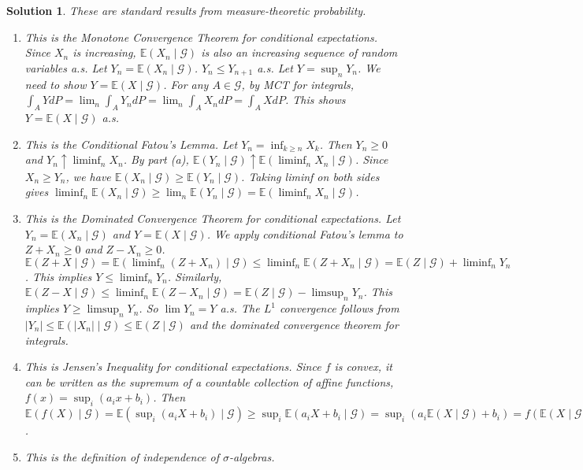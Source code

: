 \documentclass[12pt]{amsart}
\newtheorem*{solution}{Solution}
\begin{document}
\begin{solution}
These are standard results from measure-theoretic probability.
\begin{enumerate}[label=(\alph*)]
\item This is the Monotone Convergence Theorem for conditional expectations. Since $X_n$ is increasing, $\mathbb{E}(X_n \mid \mathcal{G})$ is also an increasing sequence of random variables a.s. Let $Y_n = \mathbb{E}(X_n \mid \mathcal{G})$. $Y_n \le Y_{n+1}$ a.s. Let $Y = \sup_n Y_n$. We need to show $Y = \mathbb{E}(X \mid \mathcal{G})$. For any $A \in \mathcal{G}$, by MCT for integrals, $\int_A Y dP = \lim_n \int_A Y_n dP = \lim_n \int_A X_n dP = \int_A X dP$. This shows $Y = \mathbb{E}(X \mid \mathcal{G})$ a.s.
\item This is the Conditional Fatou's Lemma. Let $Y_n = \inf_{k \ge n} X_k$. Then $Y_n \ge 0$ and $Y_n \uparrow \liminf_n X_n$. By part (a), $\mathbb{E}(Y_n \mid \mathcal{G}) \uparrow \mathbb{E}(\liminf_n X_n \mid \mathcal{G})$. Since $X_n \ge Y_n$, we have $\mathbb{E}(X_n \mid \mathcal{G}) \ge \mathbb{E}(Y_n \mid \mathcal{G})$. Taking liminf on both sides gives $\liminf_n \mathbb{E}(X_n \mid \mathcal{G}) \ge \lim_n \mathbb{E}(Y_n \mid \mathcal{G}) = \mathbb{E}(\liminf_n X_n \mid \mathcal{G})$.
\item This is the Dominated Convergence Theorem for conditional expectations. Let $Y_n = \mathbb{E}(X_n \mid \mathcal{G})$ and $Y = \mathbb{E}(X \mid \mathcal{G})$. We apply conditional Fatou's lemma to $Z+X_n \ge 0$ and $Z-X_n \ge 0$.
$\mathbb{E}(Z+X \mid \mathcal{G}) = \mathbb{E}(\liminf_n(Z+X_n) \mid \mathcal{G}) \le \liminf_n \mathbb{E}(Z+X_n \mid \mathcal{G}) = \mathbb{E}(Z \mid \mathcal{G}) + \liminf_n Y_n$. This implies $Y \le \liminf_n Y_n$.
Similarly, $\mathbb{E}(Z-X \mid \mathcal{G}) \le \liminf_n \mathbb{E}(Z-X_n \mid \mathcal{G}) = \mathbb{E}(Z \mid \mathcal{G}) - \limsup_n Y_n$. This implies $Y \ge \limsup_n Y_n$.
So $\lim Y_n = Y$ a.s. The $L^1$ convergence follows from $|Y_n| \le \mathbb{E}(|X_n| \mid \mathcal{G}) \le \mathbb{E}(Z \mid \mathcal{G})$ and the dominated convergence theorem for integrals.
\item This is Jensen's Inequality for conditional expectations. Since $f$ is convex, it can be written as the supremum of a countable collection of affine functions, $f(x) = \sup_i (a_i x + b_i)$.
Then $\mathbb{E}(f(X) \mid \mathcal{G}) = \mathbb{E}(\sup_i(a_i X + b_i) \mid \mathcal{G}) \ge \sup_i \mathbb{E}(a_i X + b_i \mid \mathcal{G}) = \sup_i (a_i \mathbb{E}(X \mid \mathcal{G}) + b_i) = f(\mathbb{E}(X \mid \mathcal{G}))$.
\item This is the definition of independence of $\sigma$-algebras.
\end{enumerate}
\end{solution}
\end{document}
